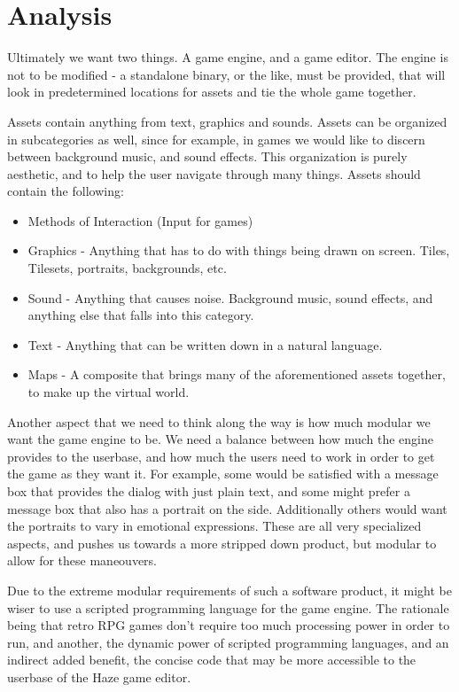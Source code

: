 \section{Analysis}

Ultimately we want two things. A game engine, and a game editor. The engine is 
not to be modified - a standalone binary, or the like, must be provided, that 
will look in predetermined locations for assets and tie the whole game
together.

Assets contain anything from text, graphics and sounds. Assets can be organized
in subcategories as well, since for example, in games we would like to discern
between background music, and sound effects. This organization is purely
aesthetic, and to help the user navigate through many things. Assets should 
contain the following:

\begin{itemize}
\item Methods of Interaction (Input for games)
\item Graphics - Anything that has to do with things being drawn on screen.
Tiles, Tilesets, portraits, backgrounds, etc.
\item Sound - Anything that causes noise. Background music, sound effects, and
anything else that falls into this category.
\item Text - Anything that can be written down in a natural language.
\item Maps - A composite that brings many of the aforementioned assets
together, to make up the virtual world.
\end{itemize}

Another aspect that we need to think along the way is how much modular we want 
the game engine to be. We need a balance between how much the engine provides
to the userbase, and how much the users need to work in order to get the game
as they want it. For example, some would be satisfied with a message box that 
provides the dialog with just plain text, and some might prefer a message box
that also has a portrait on the side. Additionally others would want the 
portraits to vary in emotional expressions. These are all very specialized
aspects, and pushes us towards a more stripped down product, but modular to
allow for these maneouvers. 

Due to the extreme modular requirements of such a software product, it might be
wiser to use a scripted programming language for the game engine. The rationale
being that retro RPG games don't require too much processing power in order to 
run, and another, the dynamic power of scripted programming languages, and an
indirect added benefit, the concise code that may be more accessible to the
userbase of the Haze game editor.

